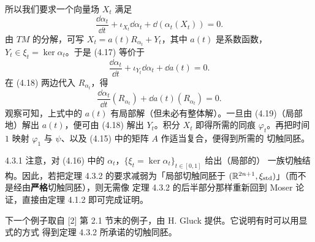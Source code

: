 所以我们要求一个向量场 $X_t$ 满足
\begin{equation}\tag{4.17}
  \frac{\dd\alpha_t}{\dd t}+\iota_{X_t}\dd\alpha_t+\dd(\alpha_t(X_t))=0.
\end{equation}
由 $TM$ 的分解，可写 $X_t=a(t)R_{\alpha_t}+Y_t$，其中 $a(t)$ 是系数函数，
$Y_t\in\xi_t=\ker\alpha_t$。于是 (4.17) 等价于
\begin{equation}\tag{4.18}
  \frac{\dd\alpha_t}{\dd t}+\iota_{Y_t}\dd\alpha_t+\dd a(t)=0.
\end{equation}
在 (4.18) 两边代入 $R_{\alpha_t}$，得
\begin{equation}\tag{4.19}
  \frac{\dd\alpha_t}{\dd t}(R_{\alpha_t})+\dd a(t)(R_{\alpha_t})=0.
\end{equation}
观察可知，上式中的 $a(t)$ 有局部解（但未必有整体解）。一旦由 (4.19)（局部地）解出
$a(t)$，便可由 (4.18) 解出 $Y_t$。积分 $X_t$ 即得所需的同痕 $\varphi_t$。再把时间
$1$ 映射 $\varphi_1$ 与 $\psi$、以及 (4.15) 中的矩阵 $A$ 作适当复合，便得到所需的
切触同胚。

\begin{wrem}{4.3.1}
  注意，对 (4.16) 中的 $\alpha_t$，$\{\xi_t=\ker\alpha_t\}_{t\in[0,1]}$ 给出（局部的）
  一族切触结构。因此，若把定理 4.3.2 的要求减弱为「局部切触同胚于
  $(\mathbb{R}^{2n+1},\xi_{\mathrm{std}})$」（而不是经由\textbf{严格}切触同胚），则无需像
  定理 4.3.2 的后半部分那样重新回到 Moser 论证，直接由定理 4.1.2 即可完成证明。
\end{wrem}

下一个例子取自 [2] 第 2.1 节末的例子，由 H. Gluck 提供。它说明有时可以用显式的方式
得到定理 4.3.2 所承诺的切触同胚。

